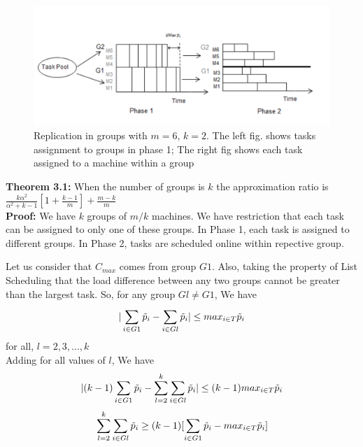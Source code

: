 \documentclass[10pt, conference, compsocconf]{IEEEtran}
\begin{document}
\begin{figure}[htp]
\centering
\includegraphics[width= 16 cm]{fig2.pdf}
\caption{Replication in groups with $m = 6$, $k = 2$. The left fig. shows tasks assignment to groups in phase 1; The right fig shows each task
assigned to a machine within a group}
\label{fig:Model 3}
\end{figure}

\textbf{Theorem 3.1:} When the number of groups is $k$ the approximation ratio is $  \frac{k\alpha^{2}}{\alpha^{2}+k-1}[1+ {\frac{k-1}{m}} ]+ {\frac{m-k}{m}}   $ \\
\textbf{Proof:} 
  We have $k$ groups of $m/k$ machines. We have restriction that each task can be assigned to only one of these groups. In Phase 1, each task is assigned to different groups. In Phase 2, tasks are scheduled online within repective group.

Let us consider  that $ C_{max}$ comes from group  $G1$. Also, taking the property of List Scheduling that the load difference between any two groups cannot be greater than the largest task. So, for any group $Gl \neq G1$, We have\\
\begin{equation}{\nonumber}
|\sum_{i \in G1 }^{}{\tilde p_{i}}- \sum_{i \in Gl }^{}{\tilde p_{i}}| \leq {max_{i \in T}}{\tilde p_{i}}\end{equation}  \hspace*{15pt}   for all, $l = 2,3,...,k$ \\

Adding for all values of $l$, We have 
\begin{equation}{\nonumber}
|(k-1)\sum_{i \in G1 }^{}{\tilde p_{i}}- \sum_{l=2}^{k}\sum_{i \in Gl }^{}{\tilde p_{i}}| \leq (k-1) {max_{i \in T}}{\tilde p_{i}}
\end{equation}
\begin{equation}{\nonumber}
 \sum_{l=2}^{k}\sum_{i \in Gl }^{}{\tilde p_{i}} \geq (k-1)[\sum_{i \in G1 }^{}{\tilde p_{i}}- {max_{i \in T}}{\tilde p_{i}}]
\end{equation}
\end{document}

